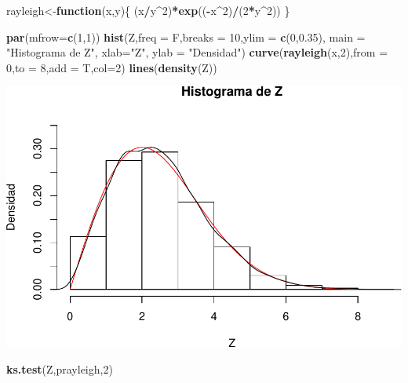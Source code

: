 \documentclass[]{article}
\newenvironment{Shaded}{\begin{snugshade}}{\end{snugshade}}
\newcommand{\KeywordTok}[1]{\textcolor[rgb]{0.13,0.29,0.53}{\textbf{#1}}}
\newcommand{\DataTypeTok}[1]{\textcolor[rgb]{0.13,0.29,0.53}{#1}}
\newcommand{\DecValTok}[1]{\textcolor[rgb]{0.00,0.00,0.81}{#1}}
\newcommand{\FloatTok}[1]{\textcolor[rgb]{0.00,0.00,0.81}{#1}}
\newcommand{\StringTok}[1]{\textcolor[rgb]{0.31,0.60,0.02}{#1}}
\newcommand{\ControlFlowTok}[1]{\textcolor[rgb]{0.13,0.29,0.53}{\textbf{#1}}}
\newcommand{\OperatorTok}[1]{\textcolor[rgb]{0.81,0.36,0.00}{\textbf{#1}}}
\newcommand{\NormalTok}[1]{#1}
\begin{document}
\begin{Shaded}
\begin{Highlighting}[]
\NormalTok{rayleigh<-}\ControlFlowTok{function}\NormalTok{(x,y)\{}
\NormalTok{  (x}\OperatorTok{/}\NormalTok{y}\OperatorTok{^}\DecValTok{2}\NormalTok{)}\OperatorTok{*}\KeywordTok{exp}\NormalTok{((}\OperatorTok{-}\NormalTok{x}\OperatorTok{^}\DecValTok{2}\NormalTok{)}\OperatorTok{/}\NormalTok{(}\DecValTok{2}\OperatorTok{*}\NormalTok{y}\OperatorTok{^}\DecValTok{2}\NormalTok{))}
\NormalTok{\}}

\KeywordTok{par}\NormalTok{(}\DataTypeTok{mfrow=}\KeywordTok{c}\NormalTok{(}\DecValTok{1}\NormalTok{,}\DecValTok{1}\NormalTok{))}
\KeywordTok{hist}\NormalTok{(Z,}\DataTypeTok{freq =}\NormalTok{ F,}\DataTypeTok{breaks =} \DecValTok{10}\NormalTok{,}\DataTypeTok{ylim =} \KeywordTok{c}\NormalTok{(}\DecValTok{0}\NormalTok{,}\FloatTok{0.35}\NormalTok{), }
     \DataTypeTok{main =} \StringTok{"Histograma de Z"}\NormalTok{, }\DataTypeTok{xlab=}\StringTok{"Z"}\NormalTok{, }\DataTypeTok{ylab =} \StringTok{"Densidad"}\NormalTok{)}
\KeywordTok{curve}\NormalTok{(}\KeywordTok{rayleigh}\NormalTok{(x,}\DecValTok{2}\NormalTok{),}\DataTypeTok{from =} \DecValTok{0}\NormalTok{,}\DataTypeTok{to =} \DecValTok{8}\NormalTok{,}\DataTypeTok{add =}\NormalTok{ T,}\DataTypeTok{col=}\DecValTok{2}\NormalTok{)}
\KeywordTok{lines}\NormalTok{(}\KeywordTok{density}\NormalTok{(Z))}
\end{Highlighting}
\end{Shaded}

\includegraphics[width=0.8\linewidth]{notebook_simulaciones_files/figure-latex/unnamed-chunk-5-1}

\begin{Shaded}
\begin{Highlighting}[]
\KeywordTok{ks.test}\NormalTok{(Z,prayleigh,}\DecValTok{2}\NormalTok{)}
\end{Highlighting}
\end{Shaded}
\end{document}
